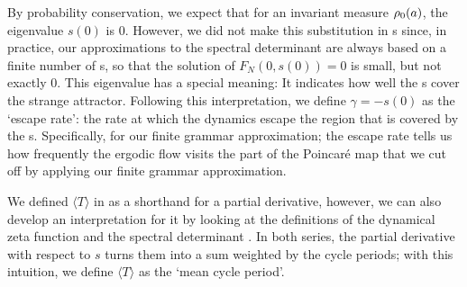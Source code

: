 
By probability conservation, we expect that for an invariant measure
$\rho_0(a)$, the eigenvalue $s(0)$ is $0$. However, we did not make
this substitution in \cycForm s since, in practice, our approximations to
the spectral determinant are always based on a finite number of \po s, so
that the solution of $F_N(0, s(0)) = 0$ is small, but not exactly $0$. This
eigenvalue has a special meaning: It indicates how well the \po s cover
the strange attractor. Following this interpretation, we define $\gamma =
- s(0)$ as the `escape rate': the rate at which the dynamics escape the
region that is covered by the \po s. Specifically, for our finite grammar
approximation; the escape rate tells us how frequently the ergodic flow
visits the part of the Poincar\'e map that we cut off by applying our
finite grammar approximation.

We defined $\langle T \rangle$ in  as a shorthand for a partial
derivative, however, we can also develop an interpretation for it by looking
at the definitions of the dynamical zeta function  and the
spectral determinant . In both series, the partial
derivative with respect to $s$ turns them into a sum weighted by the cycle
periods; with this intuition, we define $\langle T \rangle$ as the `mean cycle
period'.

